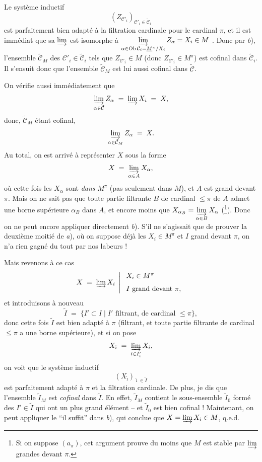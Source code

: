 Le système inductif
\[ (Z_{\mathcal{C}'_i})_{\mathcal{C}'_i\in\tilde{\mathcal{C}}_i} \]
est parfaitement bien adapté à la filtration cardinale pour le cardinal $\pi$, et il est immédiat que sa $\varinjlim$ est isomorphe à $\varinjlim\limits_{\alpha\in\operatorname{Ob}\mathcal{C}_i=\underline{M}^\pi/X_i} Z_\alpha = X_i\in M$ . Donc par \textit{b}), l'ensemble $\tilde{\mathcal{C}}_M$ des $\mathcal{C}'_i\in\tilde{\mathcal{C}}_i$ tels que $Z_{\mathcal{C}'_i}\in M$ (donc $Z_{\mathcal{C}'_i}\in M^\pi$) est cofinal dans $\tilde{\mathcal{C}}_i$. Il s'ensuit donc que l'ensemble $\tilde{\mathcal{C}}_M$ est lui aussi cofinal dans $\tilde{\mathcal{C}}$.


On vérifie aussi immédiatement que
\[ \varinjlim_{\alpha\in\tilde{\mathcal{C}}} Z_\alpha \;=\; \varinjlim X_i \;=\; X, \]
donc, $\tilde{\mathcal{C}}_M$ étant cofinal,
\[ \varinjlim_{\alpha\in\tilde{\mathcal{C}}_M} Z_\alpha \;=\; X. \]
Au total, on est arrivé à représenter $X$ sous la forme
\[ X \;=\; \varinjlim_{\alpha\in A} X_\alpha, \]
où cette fois les $X_\alpha$ sont \textit{dans} $M^\pi$ (pas seulement dans $M$), et $A$ est grand devant $\pi$. Mais on ne sait pas que toute partie filtrante $B$ de cardinal $\le\pi$ de $A$ admet une borne supérieure $\alpha_B$ dans $A$, et encore moins que $X_{\alpha_B} = \varinjlim\limits_{\alpha\in B} X_\alpha$ (\footnote{Si on suppose $(a_\pi)$, cet argument prouve du moins que $M$ est stable par $\varinjlim$ grandes devant $\pi$.}). Donc on ne peut encore appliquer directement \textit{b}). S'il ne s'agissait que de prouver la deuxième moitié de \textit{a}), où on suppose déjà les $X_i\in M^\pi$ et $I$ grand devant $\pi$, on n'a rien gagné du tout par nos labeurs !

Mais revenons à ce cas
\[ X \;=\; \varinjlim X_i \;\left|\; \begin{array}{l} X_i\in M^\pi \\[1.5ex] I \text{ grand devant } \pi, \end{array}\right. \]
et introduisons à nouveau
\[ \tilde{I} \;=\; \{I'\subset I \mid I' \text{ filtrant, de cardinal } \le\pi\}, \]
donc cette fois $\tilde{I}$ est bien adapté à $\pi$ (filtrant, et toute partie filtrante de cardinal $\le\pi$ a une borne supérieure), et si on pose
\[ X_{\tilde{\imath}} \;=\; \varinjlim_{i\in I'_{\tilde{\imath}}} X_i, \]
on voit que le système inductif
\[ (X_{\tilde{\imath}})_{\tilde{\imath}\in\tilde{I}} \]
est parfaitement adapté à $\pi$ et la filtration cardinale. De plus, je dis que l'ensemble $\tilde{I}_M$ est \textit{cofinal} dans $\tilde{I}$. En effet, $\tilde{I}_M$ contient le sous-ensemble $\tilde{I}_0$ formé des $I'\in\tilde{I}$ qui ont un plus grand élément -- et $\tilde{I}_0$ est bien cofinal ! Maintenant, on peut appliquer
le ``il suffit'' dans \textit{b}), qui conclue que $X = \varinjlim X_i\in M$, q.e.d. %

